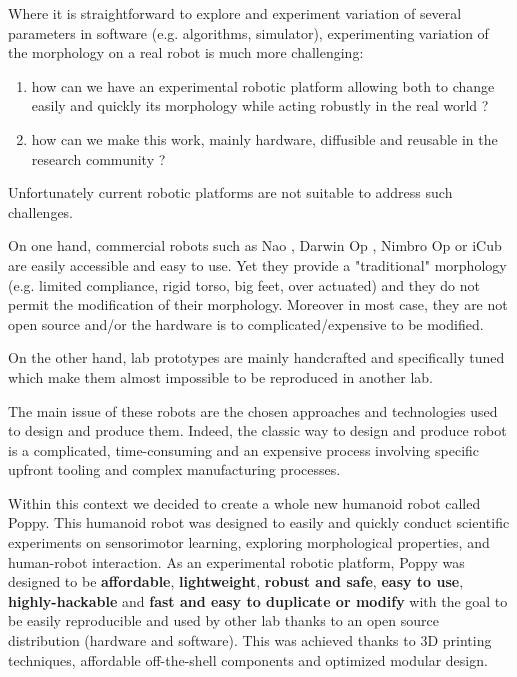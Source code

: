 Where it is straightforward to explore and experiment variation of several parameters in software (e.g. algorithms, simulator), experimenting variation of the morphology on a real robot is much more challenging:

\begin{enumerate}
    \item how can we have an experimental robotic platform allowing both to change easily and quickly its morphology while acting robustly in the real world ?
    \item how can we make this work, mainly hardware, diffusible and reusable in the research community ?
\end{enumerate}

Unfortunately current robotic platforms are not suitable to address such challenges.

On one hand, commercial robots such as Nao \cite{gouaillier2008nao}, Darwin Op \cite{ha2011development}, Nimbro Op \cite{schwarznimbro} or iCub \cite{metta2008icub} are easily accessible and easy to use. Yet they provide a "traditional" morphology (e.g. limited compliance, rigid torso, big feet, over actuated) and they do not permit the modification of their morphology. Moreover in most case, they are not open source and/or the hardware is to complicated/expensive to be modified.

On the other hand, lab prototypes are mainly handcrafted and specifically tuned which make them almost impossible to be reproduced in another lab.

The main issue of these robots are the chosen approaches and technologies used to design and produce them. Indeed, the classic way to design and produce robot is a complicated, time-consuming and an expensive process involving specific upfront tooling and complex manufacturing processes.


Within this context we decided to create a whole new humanoid robot called Poppy. This humanoid robot was designed to easily and quickly conduct scientific experiments on sensorimotor learning, exploring morphological properties, and human-robot interaction. As an experimental robotic platform, Poppy was designed to be \textbf{affordable}, \textbf{lightweight}, \textbf{robust and safe}, \textbf{easy to use}, \textbf{highly-hackable} and \textbf{fast and easy to duplicate or modify} with the goal to be easily reproducible and used by other lab thanks to an open source distribution (hardware and software). This was achieved thanks to 3D printing techniques, affordable off-the-shell components and optimized modular design.


